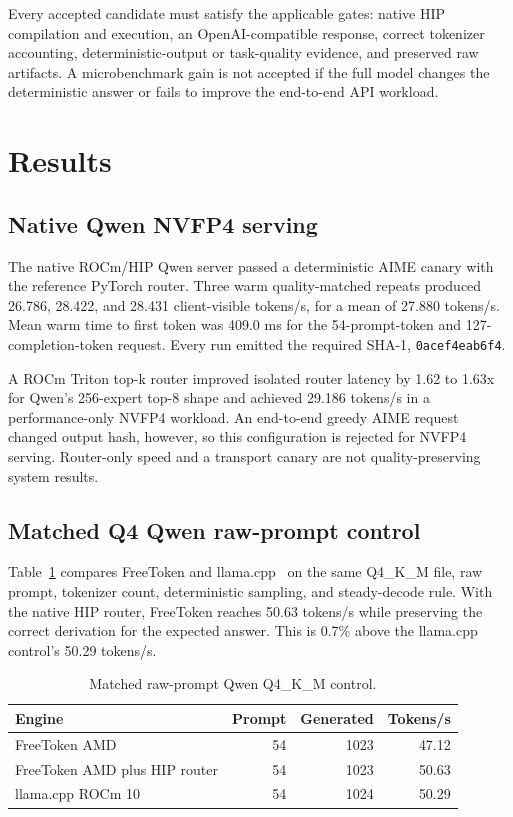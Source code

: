 \documentclass[10pt,letterpaper,twocolumn]{article}
\begin{document}
Every accepted candidate must satisfy the applicable gates: native HIP compilation and execution, an OpenAI-compatible response, correct tokenizer accounting, deterministic-output or task-quality evidence, and preserved raw artifacts. A microbenchmark gain is not accepted if the full model changes the deterministic answer or fails to improve the end-to-end API workload.

\section{Results}

\subsection{Native Qwen NVFP4 serving}

The native ROCm/HIP Qwen server passed a deterministic AIME canary with the reference PyTorch router. Three warm quality-matched repeats produced 26.786, 28.422, and 28.431 client-visible tokens/s, for a mean of 27.880 tokens/s. Mean warm time to first token was 409.0 ms for the 54-prompt-token and 127-completion-token request. Every run emitted the required SHA-1, \texttt{0acef4eab6f4}.

A ROCm Triton top-k router improved isolated router latency by 1.62 to 1.63x for Qwen's 256-expert top-8 shape and achieved 29.186 tokens/s in a performance-only NVFP4 workload. An end-to-end greedy AIME request changed output hash, however, so this configuration is rejected for NVFP4 serving. Router-only speed and a transport canary are not quality-preserving system results.

\subsection{Matched Q4 Qwen raw-prompt control}

Table~\ref{tab:q4} compares FreeToken and llama.cpp~\cite{llamacpp} on the same Q4\_K\_M file, raw prompt, tokenizer count, deterministic sampling, and steady-decode rule. With the native HIP router, FreeToken reaches 50.63 tokens/s while preserving the correct derivation for the expected answer. This is 0.7\% above the llama.cpp control's 50.29 tokens/s.

\begin{table}[t]
\caption{Matched raw-prompt Qwen Q4\_K\_M control.}
\label{tab:q4}
\centering
\small
\begin{tabular}{p{}rrr}
\toprule
Engine & Prompt & Generated & Tokens/s \\
\midrule
FreeToken AMD & 54 & 1023 & 47.12 \\
FreeToken AMD plus HIP router & 54 & 1023 & 50.63 \\
llama.cpp ROCm 10 & 54 & 1024 & 50.29 \\
\bottomrule
\end{tabular}
\end{table}
\end{document}
